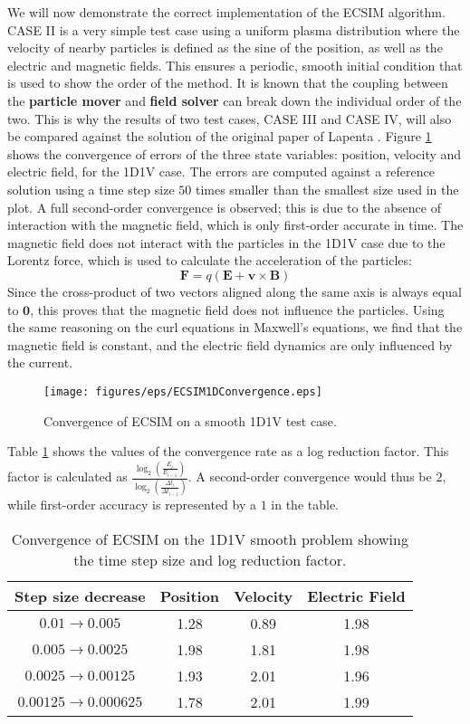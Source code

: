 We will now demonstrate the correct implementation of the ECSIM algorithm. CASE II is a very simple test case using a uniform plasma distribution where the velocity of nearby particles is defined as the sine of the position, as well as the electric and magnetic fields. This ensures a periodic, smooth initial condition that is used to show the order of the method. It is known that the coupling between the \textbf{particle mover} and \textbf{field solver} can break down the individual order of the two. This is why the results of two test cases, CASE III and CASE IV, will also be compared against the solution of the original paper of Lapenta \cite{lapenta_exactly_2017}. Figure \ref{fig: 1D-1V-convergence} shows the convergence of errors of the three state variables: position, velocity and electric field, for the 1D1V case. The errors are computed against a reference solution using a time step size $50$ times smaller than the smallest size used in the plot. A full second-order convergence is observed; this is due to the absence of interaction with the magnetic field, which is only first-order accurate in time. The magnetic field does not interact with the particles in the 1D1V case due to the Lorentz force, which is used to calculate the acceleration of the particles: 
\[\textbf{F} = q\left(\textbf{E} + \textbf{v} \times \textbf{B}\right)\]
Since the cross-product of two vectors aligned along the same axis is always equal to $\textbf{0}$, this proves that the magnetic field does not influence the particles. Using the same reasoning on the curl equations in Maxwell's equations, we find that the magnetic field is constant, and the electric field dynamics are only influenced by the current. 
\begin{figure}[h]
    \centering
    \texttt{[image: figures/eps/ECSIM1DConvergence.eps]}
    \caption{Convergence of ECSIM on a smooth 1D1V test case.}
    \label{fig: 1D-1V-convergence}
\end{figure}
Table \ref{tab: 1D1V-convergence} shows the values of the convergence rate as a log reduction factor. This factor is calculated as $\frac{\log_{2}\left(\frac{E_i}{E_{i-1}}\right)}{\log_{2}\left(\frac{\Delta t_i}{\Delta t_{i-1}}\right)}$. A second-order convergence would thus be $2$, while first-order accuracy is represented by a $1$ in the table.
\begin{table}[h!]
\centering
\begin{tabular}{cccc}
\toprule
\textbf{Step size decrease} & \textbf{Position}& \textbf{Velocity} & \textbf{Electric Field}\\
\midrule
$0.01 \rightarrow 0.005$ & 1.28  & 0.89 & 1.98 \\
$0.005\rightarrow0.0025$ & 1.98 & 1.81 & 1.98\\
$0.0025\rightarrow0.00125$ & 1.93 & 2.01 & 1.96\\
$0.00125\rightarrow0.000625$ & 1.78& 2.01&1.99\\
\bottomrule
\end{tabular}
\caption{Convergence of ECSIM on the 1D1V smooth problem showing the time step size and log reduction factor.}
\label{tab: 1D1V-convergence}
\end{table}

